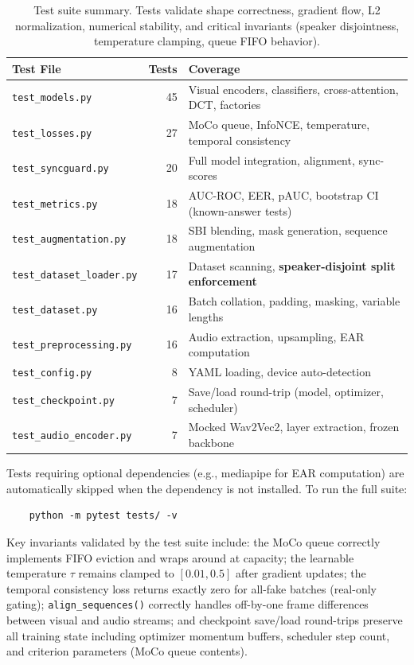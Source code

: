 \documentclass[12pt, letterpaper]{article}
\begin{document}
\renewcommand{\arraystretch}{1.4}
\begin{table}[H]
\centering
\begin{tabularx}{\textwidth}{@{} p{4cm} r X @{}}
\toprule
\textbf{Test File} & \textbf{Tests} & \textbf{Coverage} \\
\midrule
\texttt{test\_models.py} & 45 & Visual encoders, classifiers, cross-attention, DCT, factories \\
\texttt{test\_losses.py} & 27 & MoCo queue, InfoNCE, temperature, temporal consistency \\
\texttt{test\_syncguard.py} & 20 & Full model integration, alignment, sync-scores \\
\texttt{test\_metrics.py} & 18 & AUC-ROC, EER, pAUC, bootstrap CI (known-answer tests) \\
\texttt{test\_augmentation.py} & 18 & SBI blending, mask generation, sequence augmentation \\
\texttt{test\_dataset\_loader.py} & 17 & Dataset scanning, \textbf{speaker-disjoint split enforcement} \\
\texttt{test\_dataset.py} & 16 & Batch collation, padding, masking, variable lengths \\
\texttt{test\_preprocessing.py} & 16 & Audio extraction, upsampling, EAR computation \\
\texttt{test\_config.py} & 8 & YAML loading, device auto-detection \\
\texttt{test\_checkpoint.py} & 7 & Save/load round-trip (model, optimizer, scheduler) \\
\texttt{test\_audio\_encoder.py} & 7 & Mocked Wav2Vec2, layer extraction, frozen backbone \\
\bottomrule
\end{tabularx}
\caption{Test suite summary. Tests validate shape correctness, gradient flow, L2 normalization, numerical stability, and critical invariants (speaker disjointness, temperature clamping, queue FIFO behavior).}
\end{table}
\renewcommand{\arraystretch}{1.0}

Tests requiring optional dependencies (e.g., mediapipe for EAR computation) are automatically skipped when the dependency is not installed. To run the full suite:

\begin{verbatim}
    python -m pytest tests/ -v
\end{verbatim}

Key invariants validated by the test suite include: the MoCo queue correctly implements FIFO eviction and wraps around at capacity; the learnable temperature $\tau$ remains clamped to $[0.01, 0.5]$ after gradient updates; the temporal consistency loss returns exactly zero for all-fake batches (real-only gating); \texttt{align\_sequences()} correctly handles off-by-one frame differences between visual and audio streams; and checkpoint save/load round-trips preserve all training state including optimizer momentum buffers, scheduler step count, and criterion parameters (MoCo queue contents).
\end{document}
